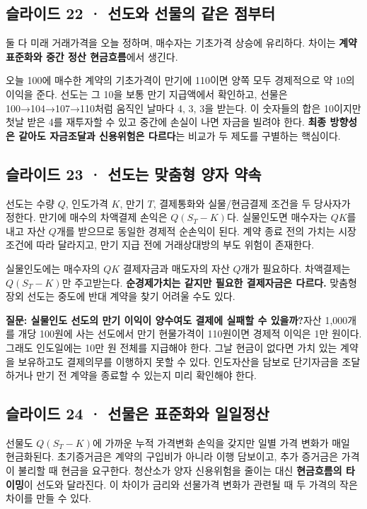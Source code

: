 \documentclass[11pt,a4paper]{article}
\begin{document}
\subsection{슬라이드 22 · 선도와 선물의 같은 점부터}
둘 다 미래 거래가격을 오늘 정하며, 매수자는 기초가격 상승에 유리하다. 차이는 \textbf{계약 표준화와 중간 정산 현금흐름}에서 생긴다.\par

오늘 100에 매수한 계약의 기초가격이 만기에 110이면 양쪽 모두 경제적으로 약 10의 이익을 준다. 선도는 그 10을 보통 만기 지급액에서 확인하고, 선물은 100→104→107→110처럼 움직인 날마다 4, 3, 3을 받는다. 이 숫자들의 합은 10이지만 첫날 받은 4를 재투자할 수 있고 중간에 손실이 나면 자금을 빌려야 한다. \textbf{최종 방향성은 같아도 자금조달과 신용위험은 다르다}는 비교가 두 제도를 구별하는 핵심이다.\par

\subsection{슬라이드 23 · 선도는 맞춤형 양자 약속}
선도는 수량 $Q$, 인도가격 $K$, 만기 $T$, 결제통화와 실물/현금결제 조건을 두 당사자가 정한다. 만기에 매수의 차액결제 손익은 $Q(S_T-K)$다. 실물인도면 매수자는 $QK$를 내고 자산 $Q$개를 받으므로 동일한 경제적 순손익이 된다. 계약 종료 전의 가치는 시장조건에 따라 달라지고, 만기 지급 전에 거래상대방의 부도 위험이 존재한다.\par

실물인도에는 매수자의 $QK$ 결제자금과 매도자의 자산 $Q$개가 필요하다. 차액결제는 $Q(S_T-K)$만 주고받는다. \textbf{순경제가치는 같지만 필요한 결제자금은 다르다.} 맞춤형 장외 선도는 중도에 반대 계약을 찾기 어려울 수도 있다.\par

\par\medskip\noindent\textbf{질문: 실물인도 선도의 만기 이익이 양수여도 결제에 실패할 수 있을까?}\quad 자산 1,000개를 개당 100원에 사는 선도에서 만기 현물가격이 110원이면 경제적 이익은 1만 원이다. 그래도 인도일에는 10만 원 전체를 지급해야 한다. 그날 현금이 없다면 가치 있는 계약을 보유하고도 결제의무를 이행하지 못할 수 있다. 인도자산을 담보로 단기자금을 조달하거나 만기 전 계약을 종료할 수 있는지 미리 확인해야 한다.\par

\subsection{슬라이드 24 · 선물은 표준화와 일일정산}
선물도 $Q(S_T-K)$에 가까운 누적 가격변화 손익을 갖지만 일별 가격 변화가 매일 현금화된다. 초기증거금은 계약의 구입비가 아니라 이행 담보이고, 추가 증거금은 가격이 불리할 때 현금을 요구한다. 청산소가 양자 신용위험을 줄이는 대신 \textbf{현금흐름의 타이밍}이 선도와 달라진다. 이 차이가 금리와 선물가격 변화가 관련될 때 두 가격의 작은 차이를 만들 수 있다.\par
\end{document}

